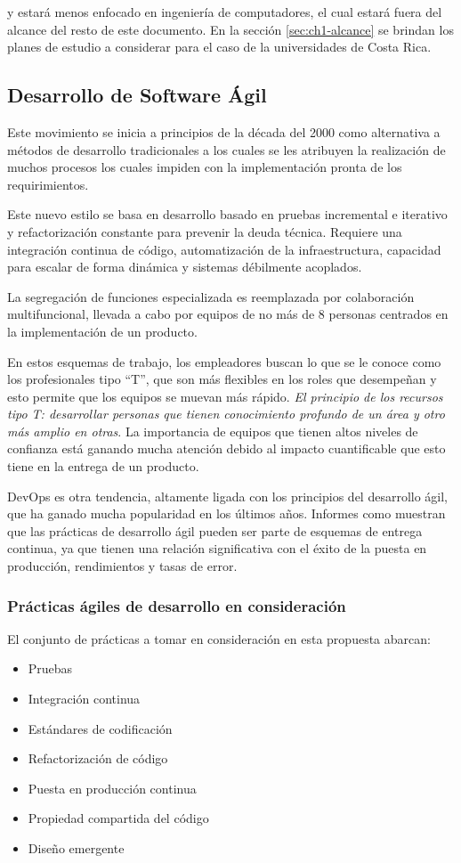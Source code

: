 y estará menos enfocado en ingeniería de computadores, el cual estará fuera del alcance del resto de este documento. En la sección \ref{sec:ch1-alcance} se brindan los planes de estudio a considerar para el caso de la universidades de Costa Rica.


\subsection{Desarrollo de Software Ágil}
Este movimiento se inicia a principios de la década del 2000 como alternativa a métodos de desarrollo tradicionales a los cuales se les atribuyen la realización de muchos procesos los cuales impiden con la implementación pronta de los requirimientos. 

Este nuevo estilo se basa en desarrollo basado en pruebas incremental e iterativo y refactorización constante para prevenir la deuda técnica. Requiere una integración continua de código, automatización de la infraestructura, capacidad para escalar de forma dinámica y sistemas débilmente acoplados. 

La segregación de funciones especializada es reemplazada por colaboración multifuncional, llevada a cabo por equipos de no más de 8 personas centrados en la implementación de un producto. 

En estos esquemas de trabajo, los empleadores buscan lo que se le conoce como los profesionales tipo ``T'', que son más flexibles en los roles que desempeñan y esto permite que los equipos se muevan más rápido. \emph{El principio de los recursos tipo T: desarrollar personas que tienen conocimiento profundo de un área y otro más amplio en otras}. La importancia de equipos que tienen altos niveles de confianza está ganando mucha atención debido al impacto cuantificable que esto tiene en la entrega de un producto. \cite{rozovsky}

DevOps es otra tendencia, altamente ligada con los principios del desarrollo ágil, que ha ganado mucha popularidad en los últimos años. Informes como \cite{puppet-devops} muestran que las prácticas de desarrollo ágil pueden ser parte de esquemas de entrega continua, ya que tienen una relación significativa con el éxito de la puesta en producción, rendimientos y tasas de error. 

\subsubsection{Prácticas ágiles de desarrollo en consideración}
El conjunto de prácticas a tomar en consideración en esta propuesta abarcan:
\begin{itemize}
    \item Pruebas
    \item Integración continua
    \item Estándares de codificación
    \item Refactorización de código
    \item Puesta en producción continua
    \item Propiedad compartida del código
    \item Diseño emergente
\end{itemize}

